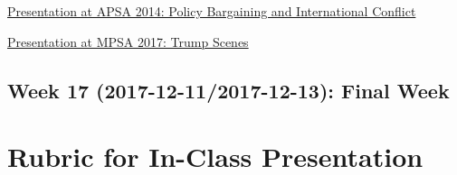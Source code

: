 \documentclass[11pt,]{article}
\theoremstyle{definition}
\theoremstyle{definition}
\theoremstyle{remark}
\begin{document}
\href{https://www.youtube.com/watch?v=bwNBXuz2eRg}{Presentation at APSA
2014: Policy Bargaining and International Conflict}

\href{https://www.youtube.com/watch?v=Z4ISkF2H4tk}{Presentation at MPSA
2017: Trump Scenes}

\subsection{Week 17 (2017-12-11/2017-12-13): Final
Week}\label{week-17-2017-12-112017-12-13-final-week}

\clearpage

\section{Rubric for In-Class
Presentation}\label{rubric-for-in-class-presentation}
\end{document}
